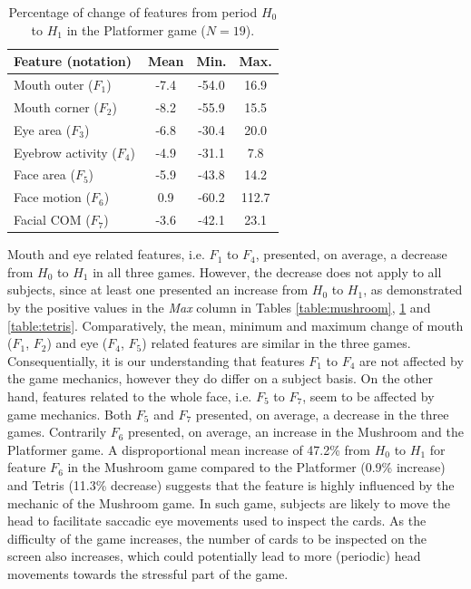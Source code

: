 \begin{table}
    \caption{Percentage of change of features from period $H_0$ to $H_1$ in the Platformer game ($N=19$).}
    \label{table:platformer}
    \centering
    \begin{threeparttable}
        \begin{tabular}{lccc}
            \hline
                \textbf{Feature (notation)} & \textbf{Mean} & \textbf{Min.} & \textbf{Max.} \\
            \hline
                Mouth outer ($F_1$)      & -7.4 & -54.0 & 16.9  \\
                Mouth corner ($F_2$)     & -8.2 & -55.9 & 15.5  \\
            \hline
                Eye area ($F_3$)         & -6.8 & -30.4 & 20.0  \\
                Eyebrow activity ($F_4$) & -4.9 & -31.1 & 7.8   \\
            \hline
                Face area ($F_5$)        & -5.9 & -43.8 & 14.2  \\
                Face motion ($F_6$)      & 0.9  & -60.2 & 112.7 \\
                Facial COM ($F_7$)       & -3.6 & -42.1 & 23.1  \\
            \hline
        \end{tabular}
        \begin{tablenotes}
          \small
          \item[]{}
        \end{tablenotes}
    \end{threeparttable}
\end{table}

Mouth and eye related features, i.e. $F_1$ to $F_4$, presented, on average, a decrease from $H_0$ to $H_1$ in all three games. However, the decrease does not apply to all subjects, since at least one presented an increase from $H_0$ to $H_1$, as demonstrated by the positive values in the \textit{Max} column in Tables \ref{table:mushroom}, \ref{table:platformer} and \ref{table:tetris}. Comparatively, the mean, minimum and maximum change of mouth ($F_1$, $F_2$) and eye ($F_4$, $F_5$) related features are similar in the three games. Consequentially, it is our understanding that features $F_1$ to $F_4$ are not affected by the game mechanics, however they do differ on a subject basis. On the other hand, features related to the whole face, i.e. $F_5$ to $F_7$, seem to be affected by game mechanics. Both $F_5$ and $F_7$ presented, on average, a decrease in the three games. Contrarily $F_6$ presented, on average, an increase in the Mushroom and the Platformer game. A disproportional mean increase of 47.2\% from $H_0$ to $H_1$ for feature $F_6$ in the Mushroom game compared to the Platformer (0.9\% increase) and Tetris (11.3\% decrease) suggests that the feature is highly influenced by the mechanic of the Mushroom game. In such game, subjects are likely to move the head to facilitate saccadic eye movements used to inspect the cards. As the difficulty of the game increases, the number of cards to be inspected on the screen also increases, which could potentially lead to more (periodic) head movements towards the stressful part of the game.

